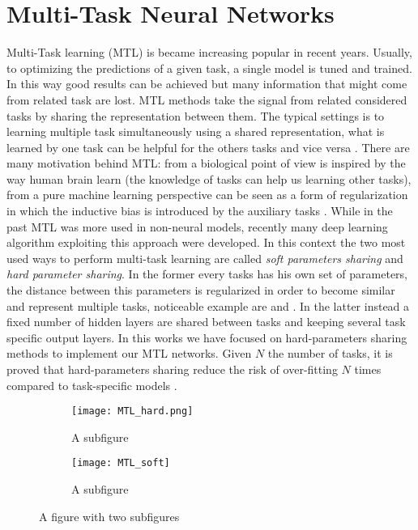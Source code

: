 \section{Multi-Task Neural Networks}\label{sec:MTLsection}
Multi-Task learning (MTL) is became increasing popular in recent years.
Usually, to optimizing the predictions of a given task, a single model is
tuned and trained. In this way good results can be achieved but many
information that might come from related task are lost. MTL methods take
the signal from related considered tasks by sharing the
representation between them. The typical settings is to learning multiple
task simultaneously using a shared representation, what is learned by one
task can be helpful for the others tasks and vice versa \cite{Caruana97}.
There are many motivation behind MTL: from a biological point of view is
inspired by the way human brain learn (the knowledge of tasks can help us
learning other tasks), from a pure machine learning perspective
can be seen as a form of regularization in which the inductive bias is
introduced by the auxiliary tasks \cite{Ruder2017}. While in the past MTL
was more used in non-neural models, recently many deep learning algorithm 
exploiting this approach were developed. In this context the two
most used ways to perform multi-task learning are called \emph{soft
parameters sharing} and \emph{hard parameter sharing}. In the former
every tasks has his own set of parameters, the distance between this
parameters is regularized in order to become similar and represent
multiple tasks, noticeable example are \cite{duong-etal-2015-low} and
\cite{yang2016trace}. In the latter instead a fixed number of hidden
layers are shared between tasks and keeping several task specific output
layers. In this works we have focused on hard-parameters sharing methods
to implement our MTL networks. Given $N$ the number of tasks, it is proved
that hard-parameters sharing reduce the risk of over-fitting $N$ times
compared to task-specific models \cite{baxter1997}.
\begin{figure}
\centering
\begin{subfigure}{.5\textwidth}
  \centering
  \texttt{[image: MTL\_hard.png]}
  \caption{A subfigure}
  \label{fig:sub1}
\end{subfigure}%
\begin{subfigure}{.5\textwidth}
  \centering
  \texttt{[image: MTL\_soft]}
  \caption{A subfigure}
  \label{fig:sub2}
\end{subfigure}
\caption{A figure with two subfigures}
\label{fig:test}
\end{figure}

